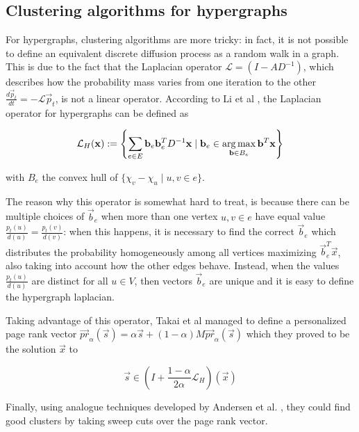 \documentclass[../main.tex]{subfiles}
\begin{document}
	\subsection{Clustering algorithms for hypergraphs}
	\label{subsec:clustering_algos_for_hypergraphs}
	
	For hypergraphs, clustering algorithms are more tricky: in fact, it is not possible to define an equivalent discrete diffusion process as a random walk in a graph. This is due to the fact that the Laplacian operator $\mathcal{L}=(I-AD^{-1})$, which describes how the probability mass varies from one iteration to the other $\frac{d\vec{p}_t}{dt} = -\mathcal{L} \vec{p}_t$, is not a linear operator. According to Li et al \cite{Li_Milenkovic_Laplacian_hypergraphs}, the Laplacian operator for hypergraphs can be defined as 
	
	\begin{equation}
		\mathcal{L}_H(\mathbf{x}) := \left\{\sum_{e\in E} \mathbf{b}_e \mathbf{b}_e^T D^{-1}\mathbf{x} \mid \mathbf{b}_e \in \operatorname*{arg\,max}_{\mathbf{b} \in B_e} \mathbf{b}^T \mathbf{x}\right\}
	\end{equation}

	with $B_e$ the convex hull of $\{\chi_v - \chi_u \mid u,v \in e\}$. 
	
	The reason why this operator is somewhat hard to treat, is because there can be multiple choices of $\vec{b}_e$ when more than one vertex $u,v\in e$ have equal value $\frac{p_t(u)}{d(u)} = \frac{p_t(v)}{d(v)}$: when this happens, it is necessary to find the correct $\vec{b}_e$ which distributes the probability homogeneously among all vertices maximizing $\vec{b}_e^T\vec{x}$, also taking into account how the other edges behave. Instead, when the values $\frac{p_t(u)}{d(u)}$ are distinct for all $u\in V$, then vectors $\vec{b}_e$ are unique and it is easy to define the hypergraph laplacian. 
	
	Taking advantage of this operator, Takai et al \cite{Takai_2020} managed to define a personalized page rank vector $\vec{pr}_{\alpha}(\vec{s}) = \alpha \vec{s} + (1-\alpha)M\vec{pr}_{\alpha}(\vec{s})$ which they proved to be the solution $\vec{x}$ to 
	
	\begin{equation}
	\label{eq:ppr_hypergraph_solution}
		\vec{s} \in \left(I + \frac{1-\alpha}{2\alpha}\mathcal{L}_H\right)(\vec{x})
	\end{equation}
	
	Finally, using analogue techniques developed by Andersen et al. \cite{AndersenPPRClustering} , they could find good clusters by taking sweep cuts over the page rank vector.
	
\end{document}
